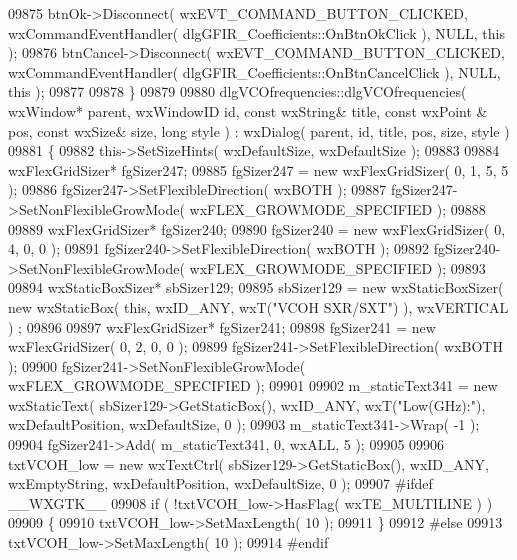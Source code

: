 \begin{DoxyCode}
09875     btnOk->Disconnect( wxEVT\_COMMAND\_BUTTON\_CLICKED, wxCommandEventHandler( 
      dlgGFIR_Coefficients::OnBtnOkClick ), NULL, \textcolor{keyword}{this} );
09876     btnCancel->Disconnect( wxEVT\_COMMAND\_BUTTON\_CLICKED, wxCommandEventHandler( 
      dlgGFIR_Coefficients::OnBtnCancelClick ), NULL, \textcolor{keyword}{this} );
09877     
09878 \}
09879 
09880 dlgVCOfrequencies::dlgVCOfrequencies( wxWindow* parent, wxWindowID \textcolor{keywordtype}{id}, \textcolor{keyword}{const} wxString& title, \textcolor{keyword}{const} wxPoint
      & pos, \textcolor{keyword}{const} wxSize& size, \textcolor{keywordtype}{long} style ) : wxDialog( parent, id, title, pos, size, style )
09881 \{
09882     this->SetSizeHints( wxDefaultSize, wxDefaultSize );
09883     
09884     wxFlexGridSizer* fgSizer247;
09885     fgSizer247 = \textcolor{keyword}{new} wxFlexGridSizer( 0, 1, 5, 5 );
09886     fgSizer247->SetFlexibleDirection( wxBOTH );
09887     fgSizer247->SetNonFlexibleGrowMode( wxFLEX\_GROWMODE\_SPECIFIED );
09888     
09889     wxFlexGridSizer* fgSizer240;
09890     fgSizer240 = \textcolor{keyword}{new} wxFlexGridSizer( 0, 4, 0, 0 );
09891     fgSizer240->SetFlexibleDirection( wxBOTH );
09892     fgSizer240->SetNonFlexibleGrowMode( wxFLEX\_GROWMODE\_SPECIFIED );
09893     
09894     wxStaticBoxSizer* sbSizer129;
09895     sbSizer129 = \textcolor{keyword}{new} wxStaticBoxSizer( \textcolor{keyword}{new} wxStaticBox( \textcolor{keyword}{this}, wxID\_ANY, wxT(\textcolor{stringliteral}{"VCOH SXR/SXT"}) ), wxVERTICAL )
      ;
09896     
09897     wxFlexGridSizer* fgSizer241;
09898     fgSizer241 = \textcolor{keyword}{new} wxFlexGridSizer( 0, 2, 0, 0 );
09899     fgSizer241->SetFlexibleDirection( wxBOTH );
09900     fgSizer241->SetNonFlexibleGrowMode( wxFLEX\_GROWMODE\_SPECIFIED );
09901     
09902     m_staticText341 = \textcolor{keyword}{new} wxStaticText( sbSizer129->GetStaticBox(), wxID\_ANY, wxT(\textcolor{stringliteral}{"Low(GHz):"}), 
      wxDefaultPosition, wxDefaultSize, 0 );
09903     m_staticText341->Wrap( -1 );
09904     fgSizer241->Add( m_staticText341, 0, wxALL, 5 );
09905     
09906     txtVCOH_low = \textcolor{keyword}{new} wxTextCtrl( sbSizer129->GetStaticBox(), wxID\_ANY, wxEmptyString, wxDefaultPosition, 
      wxDefaultSize, 0 );
09907 \textcolor{preprocessor}{    #ifdef \_\_WXGTK\_\_}
09908     \textcolor{keywordflow}{if} ( !txtVCOH_low->HasFlag( wxTE\_MULTILINE ) )
09909     \{
09910     txtVCOH_low->SetMaxLength( 10 );
09911     \}
09912 \textcolor{preprocessor}{    #else}
09913     txtVCOH_low->SetMaxLength( 10 );
09914 \textcolor{preprocessor}{    #endif}

\end{DoxyCode}
